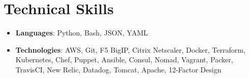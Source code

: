 \documentclass[letterpaper,11pt]{article}
\newcommand{\resumeSubHeadingListStart}{\begin{itemize}[leftmargin=*]}
\newcommand{\resumeSubHeadingListEnd}{\end{itemize}}
\begin{document}
\section{Technical Skills}
  \resumeSubHeadingListStart
    \item{
      \textbf{Languages}{: Python, Bash, JSON, YAML}
    }
      \hfill
    \item{
      \textbf{Technologies}{: AWS, Git, F5 BigIP, Citrix Netscaler, Docker, Terraform, Kubernetes,
        Chef, Puppet, Ansible, Consul, Nomad, Vagrant, Packer, TravisCI, New Relic, Datadog, Tomcat,
        Apache, 12-Factor Design}
    }
  \resumeSubHeadingListEnd


\end{document}
